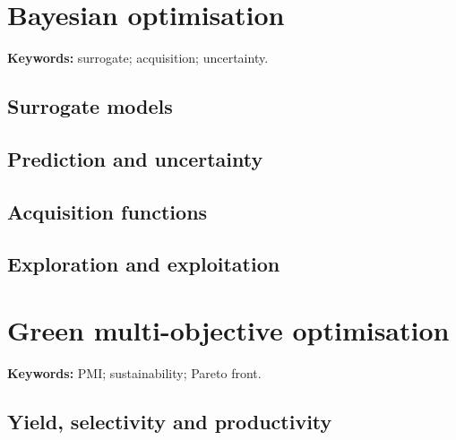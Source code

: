 
\section{Bayesian optimisation}

\begin{methodbox}
\textbf{Keywords:} surrogate; acquisition; uncertainty.
\end{methodbox}

\subsection{Surrogate models}


\subsection{Prediction and uncertainty}


\subsection{Acquisition functions}


\subsection{Exploration and exploitation}


\section{Green multi-objective optimisation}

\begin{insightbox}
\textbf{Keywords:} PMI; sustainability; Pareto front.
\end{insightbox}

\subsection{Yield, selectivity and productivity}

